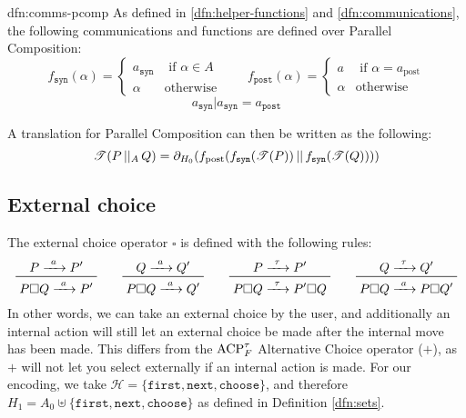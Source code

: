 \documentclass[../hons_project.tex]{subfiles}
\begin{document}
\begin{dfn}{dfn:comms-pcomp}{}
	As defined in \ref{dfn:helper-functions} and \ref{dfn:communications}, the following communications and functions are defined over Parallel Composition:
	\[f_{\mathtt{syn}}(\alpha) = \begin{cases}
			a_{\mathtt{syn}} & \text{ if } \alpha\in A \\
			\alpha           & \text{otherwise}
		\end{cases} \qquad f_{\mathtt{post}}(\alpha) = \begin{cases}
			a      & \text{ if } \alpha = a_{\mathrm{post}} \\
			\alpha & \text{otherwise}
		\end{cases}\]
	\[a_{\mathtt{syn}} | a_{\mathtt{syn}} = a_{\mathtt{post}}\]
\end{dfn}


A translation for Parallel Composition can then be written as the following:
\[\mathscr{T}(P \,\vert\vert_{A}\, Q) = \partial_{H_{0}}(f_{\mathrm{post}}(f_{\mathtt{syn}}(\mathscr{T}(P)) \,\vert\vert\, f_{\mathtt{syn}}(\mathscr{T}(Q)))) \]

\subsection{External choice}\label{ssec:external-choice}


The external choice operator $\square$ is defined with the following rules:
\begin{equation}\label{eq:csp-definition}
	\prftree{P \prightarrow{a} P'}{P \square Q \prightarrow{a} P'} \qquad \prftree{Q \prightarrow{a} Q'}{P \square Q \prightarrow{a} Q'} \qquad \prftree{P \prightarrow{\tau} P'}{P \square Q \prightarrow{\tau} P' \square Q} \qquad \prftree{Q \prightarrow{\tau} Q'}{P \square Q \prightarrow{a} P \square Q'}
\end{equation}
In other words, we can take an external choice by the user, and additionally an internal action will still let an external choice be made after the internal move has been made. This differs from the $\mathrm{ACP}_{F}^{\tau}$ Alternative Choice operator ($+$), as $+$ will not let you select externally if an internal action is made. For our encoding, we take $\mathscr{H} = \{\mathtt{first}, \mathtt{next}, \mathtt{choose}\}$, and therefore $H_{1} = A_{0} \uplus \{\mathtt{first}, \mathtt{next}, \mathtt{choose}\}$ as defined in Definition \ref{dfn:sets}.
\end{document}

